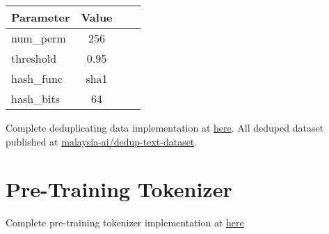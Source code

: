 \documentclass{article}
\begin{document}
\begin{table}[h]
  \centering
  \begin{tabular}{lccl}
    \hline
    \textbf{Parameter} & \textbf{Value} \\
    \hline
    num\_perm          & 256            \\
    threshold          & 0.95           \\
    hash\_func         & sha1           \\
    hash\_bits         & 64             \\
    \hline
  \end{tabular}
\end{table}

Complete deduplicating data implementation at \href{https://github.com/malaysia-ai/dedup-text-dataset?tab=readme-ov-file#text-dedup}{here}. All deduped dataset published at \href{https://huggingface.co/datasets/malaysia-ai/dedup-text-dataset}{malaysia-ai/dedup-text-dataset}.

\section{Pre-Training Tokenizer}

Complete pre-training tokenizer implementation at \href{https://github.com/malaysia-ai/prepare-tokenizer}{here}

{}

\end{document}
